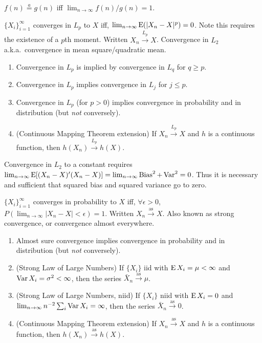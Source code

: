 \documentclass[8pt,letterpaper, landscape]{extarticle} %
\begin{document}
\begin{multicols}{3}
\begin{description}
 $ f(n) \stackrel{a}{=} g(n) $ iff $ \lim_{n \to \infty} f(n) / g(n) = 1 $.

 $ \{ X_i \}_{i=1}^{\infty} $ converges in $ L_p $ to $ X $ iff, $ \lim_{n \to \infty} \operatorname{E}( |X_n - X|^p) = 0 $. Note this requires the existence of a $ p $th moment. Written $ X_n \xrightarrow{L_p} X $. Convergence in $ L_2 $ a.k.a.\ convergence in mean square/quadratic mean.
\begin{enumerate}
\item Convergence in $ L_p $ is implied by convergence in $ L_q $ for $ q \geq p $.
\item Convergence in $ L_p $ implies convergence in $ L_j $ for $ j \leq p $.
\item Convergence in $ L_p $ (for $ p>0 $) implies convergence in probability and in distribution (but \textit{not} conversely).
\item (Continuous Mapping Theorem extension) If $ X_n \xrightarrow{L_p} X $ and $ h $ is a continuous function, then $ h(X_n) \xrightarrow{L_p} h(X) $.
\end{enumerate}
Convergence in $ L_2 $ to a constant requires $ \lim_{n \to \infty} \operatorname{E} [(X_n - X)' (X_n - X)] = \lim_{n \to \infty} \operatorname{Bias}^2 + \operatorname{Var}^2 = 0 $. Thus it is necessary and sufficient that squared bias and squared variance go to zero.

 $ \{ X_i \}_{i=1}^{\infty} $ converges in probability to $ X $ iff, $ \forall \epsilon > 0 $, $ P( \lim_{n \to \infty} |X_n - X| < \epsilon ) = 1 $. Written $ X_n \xrightarrow{\text{as}} X $. Also known as strong convergence, or convergence almost everywhere.
\begin{enumerate}
\item Almost sure convergence implies convergence in probability and in distribution (but \textit{not} conversely).
\item (Strong Law of Large Numbers) If $ \{ X_i \} $ iid with $ \operatorname{E} X_i = \mu < \infty $ and $ \operatorname{Var} X_i = \sigma^2 < \infty $, then the series $ \bar{X}_n \xrightarrow{\text{as}} \mu $.
\item (Strong Law of Large Numbers, niid) If $ \{ X_i \} $ niid with $ \operatorname{E} X_i = 0 $ and $ \lim_{n \to \infty} n^{-2} \sum_{i} \operatorname{Var} X_i = \infty $, then the series $ \bar{X}_n \xrightarrow{\text{as}} 0 $.
\item (Continuous Mapping Theorem extension) If $ X_n \xrightarrow{\text{as}} X $ and $ h $ is a continuous function, then $ h(X_n) \xrightarrow{\text{as}} h(X) $.
\end{enumerate}


\end{description}
\end{multicols}
\end{document}
